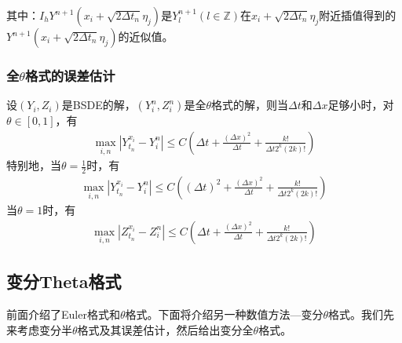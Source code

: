 			 其中：${{I_h}{Y^{n + 1}}\left( {{x_i} + \sqrt {2\Delta {t_n}}  {\eta _j}} \right)}$是$Y_{l}^{n + 1}(l \in \mathbb{Z})$在$x_i+\sqrt {2\Delta {t_n}} {\eta _j}$附近插值得到的${Y^{n + 1}}\left( {{x_i} + \sqrt {2\Delta {t_n}} {\eta _j}} \right)$的近似值。
		\subsubsection{全$\theta$格式的误差估计}
			设$(Y_i,Z_i)$是BSDE的解，$(Y_i^n,Z_i^n)$是全$\theta$格式的解，则当$\Delta {t}$和$\Delta {x}$足够小时，对$\theta \in [0,1]$，有
			\begin{align*}
			\mathop {\max }\limits_{i,n} \left| {Y_{{t_n}}^{{x_i}} - Y_i^n} \right| \leqslant C\left( {\Delta t + \frac{{{{\left( {\Delta x} \right)}^2}}}{{\Delta t}} + \frac{{k!}}{{\Delta t{2^k}\left( {2k} \right)!}}} \right)\end{align*}
			特别地，当$\theta=\frac 12$时，有
			\begin{align*}
			\mathop {\max }\limits_{i,n} \left| {Y_{{t_n}}^{{x_i}} - Y_i^n} \right| \leqslant C\left( {(\Delta t )^2+ \frac{{{{\left( {\Delta x} \right)}^2}}}{{\Delta t}} + \frac{{k!}}{{\Delta t{2^k}\left( {2k} \right)!}}} \right)\end{align*}
			 当$\theta=1$时，有
			 \begin{align*}
			 \mathop {\max }\limits_{i,n} \left| {Z_{{t_n}}^{{x_i}} - Z_i^n} \right| \leqslant C\left( {\Delta t + \frac{{{{\left( {\Delta x} \right)}^2}}}{{\Delta t}} + \frac{{k!}}{{\Delta t{2^k}\left( {2k} \right)!}}} \right)\end{align*}

	\subsection{变分Theta格式}
		\par
		前面介绍了Euler格式和$\theta$格式。下面将介绍另一种数值方法—变分$\theta$格式。我们先来考虑变分半$\theta$格式及其误差估计，然后给出变分全$\theta$格式。
